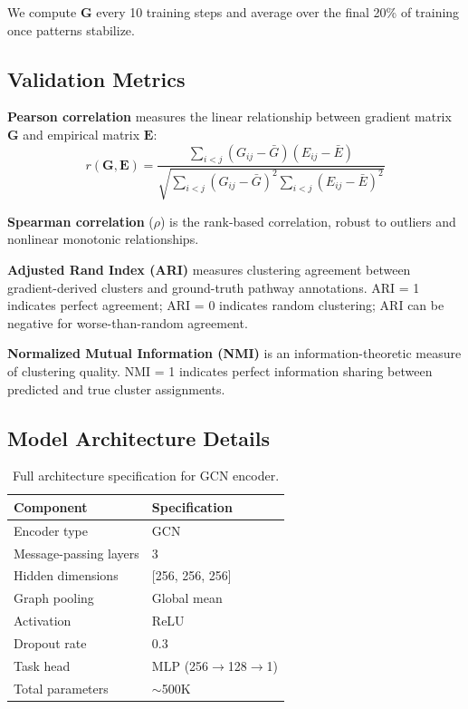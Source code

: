 \documentclass[sigconf,nonacm]{acmart}
\newcommand{\G}{\mathbf{G}}
\newcommand{\E}{\mathbf{E}}
\begin{document}
We compute $\G$ every 10 training steps and average over the final 20\% of training once patterns stabilize.

\subsection{Validation Metrics}

\textbf{Pearson correlation} measures the linear relationship between gradient matrix $\G$ and empirical matrix $\E$:
\begin{equation}
r(\G, \E) = \frac{\sum_{i<j}(G_{ij} - \bar{G})(E_{ij} - \bar{E})}{\sqrt{\sum_{i<j}(G_{ij} - \bar{G})^2 \sum_{i<j}(E_{ij} - \bar{E})^2}}
\end{equation}

\textbf{Spearman correlation} ($\rho$) is the rank-based correlation, robust to outliers and nonlinear monotonic relationships.

\textbf{Adjusted Rand Index (ARI)} measures clustering agreement between gradient-derived clusters and ground-truth pathway annotations. ARI = 1 indicates perfect agreement; ARI = 0 indicates random clustering; ARI can be negative for worse-than-random agreement.

\textbf{Normalized Mutual Information (NMI)} is an information-theoretic measure of clustering quality. NMI = 1 indicates perfect information sharing between predicted and true cluster assignments.

\subsection{Model Architecture Details}

\begin{table}[H]
\caption{Full architecture specification for GCN encoder.}
\begin{center}
\begin{tabular}{@{}ll@{}}
\toprule
Component & Specification \\
\midrule
Encoder type & GCN \\
Message-passing layers & 3 \\
Hidden dimensions & [256, 256, 256] \\
Graph pooling & Global mean \\
Activation & ReLU \\
Dropout rate & 0.3 \\
Task head & MLP (256$\to$128$\to$1) \\
Total parameters & $\sim$500K \\
\bottomrule
\end{tabular}
\end{center}
\vspace{-2mm}
\end{table}
\vspace{-2mm}
\end{document}
